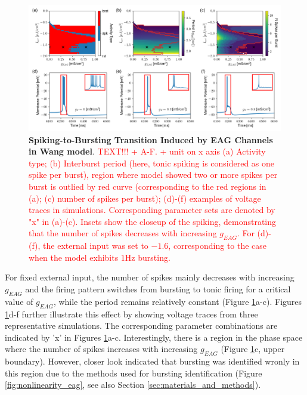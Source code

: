 \documentclass[../main.tex]{subfiles}
\begin{document}
\begin{figure}[!t]
    \centering
    \includegraphics[width=\linewidth]{../img/spiking_to_bursting/spiking_to_bursting.png}
    \caption[Spiking-to-Bursting Transition Induced by EAG Channels in Wang model]{
        \textbf{Spiking-to-Bursting Transition Induced by EAG Channels in Wang model}. \textcolor{red}{TEXT!!! + A-F. + unit on x axis (a) Activity type; (b) Interburst period (here, tonic spiking is considered as one spike per burst), region where model showed two or more spikes per burst is outlied by red curve (corresponding to the red regions in (a); (c) number of spikes per burst); (d)-(f) examples of voltage traces in simulations. Corresponding parameter sets are denoted by "x" in (a)-(c). Insets show the closeup of the spiking, demonstrating that the number of spikes decreases with increasing $g_{EAG}$. For (d)-(f), the external input was set to $-1.6$, corresponding to the case when the model exhibits $1$Hz bursting.}
    }
    \label{fig:spiking_to_bursting_wang_phase_diagram}
\end{figure}

For fixed external input, the number of spikes mainly decreases with increasing $g_{EAG}$ and the firing pattern switches from bursting to tonic firing for a critical value of $g_{EAG}$, while the period remains relatively constant (Figure \ref{fig:spiking_to_bursting_wang_phase_diagram}a-c).
Figures \ref{fig:spiking_to_bursting_wang_phase_diagram}d-f further illustrate this effect by showing voltage traces from three representative simulations. The corresponding parameter combinations are indicated by 'x' in Figures \ref{fig:spiking_to_bursting_wang_phase_diagram}a-c.
Interestingly, there is a region in the phase space where the number of spikes increases with increasing $g_{EAG}$ (Figure \ref{fig:spiking_to_bursting_wang_phase_diagram}c, upper boundary).
However, closer look indicated that bursting was identified wronly in this region due to the methods used for bursting identification (Figure \ref{fig:nonlinearity_eag}, see also Section \ref{sec:materials_and_methods}).
\end{document}
